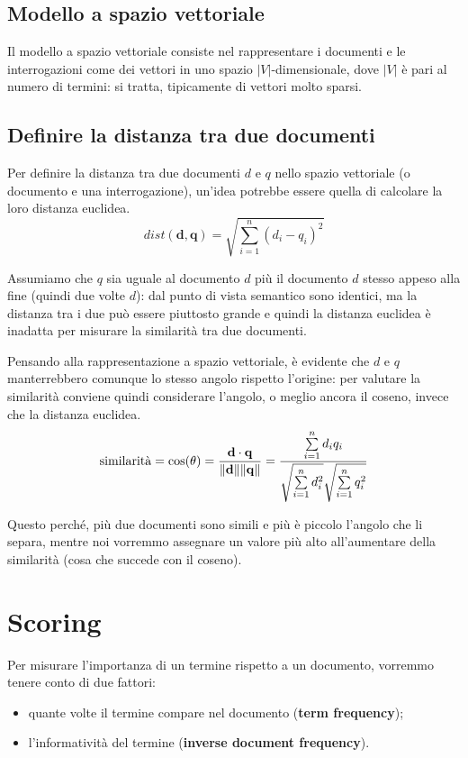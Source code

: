 \subsection{Modello a spazio vettoriale}
Il modello a spazio vettoriale consiste nel rappresentare i documenti e le interrogazioni come dei vettori in uno spazio $|V|$-dimensionale, dove $|V|$ è pari al numero di termini: si tratta, tipicamente di vettori molto sparsi.

\subsection{Definire la distanza tra due documenti}
Per definire la distanza tra due documenti $d$ e $q$ nello spazio vettoriale (o documento e una interrogazione), un'idea potrebbe essere quella di calcolare la loro distanza euclidea.
\begin{equation}
    dist(\mathbf{d},\mathbf{q}) = \sqrt{\sum_{i=1}^n {(d_i-q_i)^2}}    
\end{equation}

Assumiamo che $q$ sia uguale al documento $d$ più il documento $d$ stesso appeso alla fine (quindi due volte $d$): dal punto di vista semantico sono identici, ma la distanza tra i due può essere piuttosto grande e quindi la distanza euclidea è inadatta per misurare la similarità tra due documenti.

Pensando alla rappresentazione a spazio vettoriale, è evidente che $d$ e $q$ manterrebbero comunque lo stesso angolo rispetto l'origine: per valutare la similarità conviene quindi considerare l'angolo, o meglio ancora il coseno, invece che la distanza euclidea.
\begin{equation}
\text{similarità} = \cos(\theta) = {\mathbf{d} \cdot \mathbf{q} \over \|\mathbf{d}\| \|\mathbf{q}\|} = \frac{ \sum\limits_{i=1}^{n}{d_i  q_i} }{ \sqrt{\sum\limits_{i=1}^{n}{d_i^2}}  \sqrt{\sum\limits_{i=1}^{n}{q_i^2}}}
\end{equation}

Questo perché, più due documenti sono simili e più è piccolo l'angolo che li separa, mentre noi vorremmo assegnare un valore più alto all'aumentare della similarità (cosa che succede con il coseno). 

\section{Scoring}
Per misurare l'importanza di un termine rispetto a un documento, vorremmo tenere conto di due fattori:
\begin{itemize}
    \item quante volte il termine compare nel documento (\textbf{term frequency});
    \item l'informatività del termine (\textbf{inverse document frequency}).
\end{itemize}

